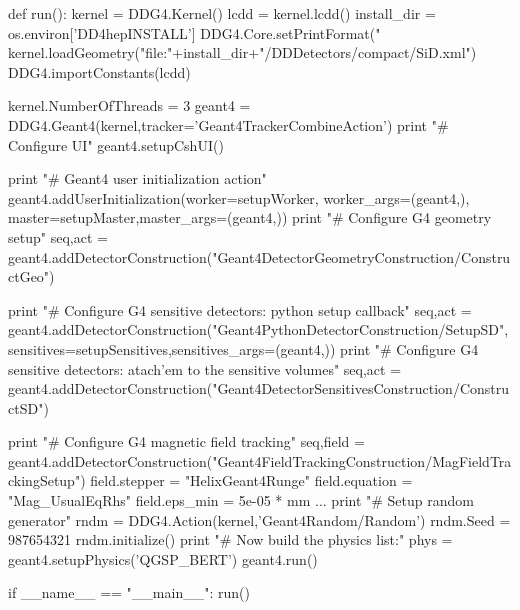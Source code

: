 \begin{code}
def run():
  kernel = DDG4.Kernel()
  lcdd = kernel.lcdd()
  install_dir = os.environ['DD4hepINSTALL']
  DDG4.Core.setPrintFormat("%
  kernel.loadGeometry("file:"+install_dir+"/DDDetectors/compact/SiD.xml")
  DDG4.importConstants(lcdd)

  kernel.NumberOfThreads = 3
  geant4 = DDG4.Geant4(kernel,tracker='Geant4TrackerCombineAction')
  print "#  Configure UI"
  geant4.setupCshUI()

  print "#  Geant4 user initialization action"
  geant4.addUserInitialization(worker=setupWorker, worker_args=(geant4,),
                               master=setupMaster,master_args=(geant4,))
  print "#  Configure G4 geometry setup"
  seq,act = geant4.addDetectorConstruction("Geant4DetectorGeometryConstruction/ConstructGeo")

  print "# Configure G4 sensitive detectors: python setup callback"
  seq,act = geant4.addDetectorConstruction("Geant4PythonDetectorConstruction/SetupSD",
                                           sensitives=setupSensitives,sensitives_args=(geant4,))
  print "# Configure G4 sensitive detectors: atach'em to the sensitive volumes"
  seq,act = geant4.addDetectorConstruction("Geant4DetectorSensitivesConstruction/ConstructSD")

  print "#  Configure G4 magnetic field tracking"
  seq,field = geant4.addDetectorConstruction("Geant4FieldTrackingConstruction/MagFieldTrackingSetup")
  field.stepper            = "HelixGeant4Runge"
  field.equation           = "Mag_UsualEqRhs"
  field.eps_min            = 5e-05 * mm
  ...
  print "#  Setup random generator"
  rndm = DDG4.Action(kernel,'Geant4Random/Random')
  rndm.Seed = 987654321
  rndm.initialize()
  print "#  Now build the physics list:"
  phys = geant4.setupPhysics('QGSP_BERT')
  geant4.run()

if __name__ == "__main__":
  run()
\end{code}

\newpage
